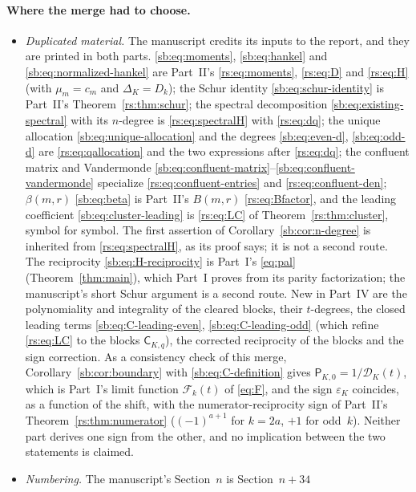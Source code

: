 \documentclass[11pt]{article}
\theoremstyle{definition}
\theoremstyle{remark}
\newcommand{\F}{\mathcal F}
\newcommand{\Den}{\mathcal D}
\newcommand{\Cblock}{\mathsf C}
\newcommand{\Pblock}{\mathsf P}
\newcommand{\epsK}{\varepsilon}
\theoremstyle{definition}
\theoremstyle{plain}
\numberwithin{equation}{section}
\begin{document}
\paragraph{Where the merge had to choose.}
\begin{itemize}
\item \emph{Duplicated material.} The manuscript credits its inputs to
the report, and they are printed in both parts.
\eqref{sb:eq:moments}, \eqref{sb:eq:hankel} and
\eqref{sb:eq:normalized-hankel} are Part~II's \eqref{rs:eq:moments},
\eqref{rs:eq:D} and \eqref{rs:eq:H} (with $\mu_m=c_m$ and $\Delta_K=D_k$);
the Schur identity \eqref{sb:eq:schur-identity} is Part~II's
Theorem~\ref{rs:thm:schur}; the spectral decomposition
\eqref{sb:eq:existing-spectral} with its $n$-degree is
\eqref{rs:eq:spectralH} with \eqref{rs:eq:dq}; the unique allocation
\eqref{sb:eq:unique-allocation} and the degrees \eqref{sb:eq:even-d},
\eqref{sb:eq:odd-d} are \eqref{rs:eq:qallocation} and the two expressions
after \eqref{rs:eq:dq}; the confluent matrix and Vandermonde
\eqref{sb:eq:confluent-matrix}--\eqref{sb:eq:confluent-vandermonde}
specialize \eqref{rs:eq:confluent-entries} and \eqref{rs:eq:confluent-den};
$\beta(m,r)$ \eqref{sb:eq:beta} is Part~II's $B(m,r)$ \eqref{rs:eq:Bfactor},
and the leading coefficient \eqref{sb:eq:cluster-leading} is
\eqref{rs:eq:LC} of Theorem~\ref{rs:thm:cluster}, symbol for symbol. The
first assertion of Corollary~\ref{sb:cor:n-degree} is inherited from
\eqref{rs:eq:spectralH}, as its proof says; it is not a second route. The
reciprocity \eqref{sb:eq:H-reciprocity} is Part~I's \eqref{eq:pal}
(Theorem~\ref{thm:main}), which Part~I proves from its parity
factorization; the manuscript's short Schur argument is a second route.
New in Part~IV are the polynomiality and integrality of the cleared blocks,
their $t$-degrees, the closed leading terms \eqref{sb:eq:C-leading-even},
\eqref{sb:eq:C-leading-odd} (which refine \eqref{rs:eq:LC} to the blocks
$\Cblock_{K,q}$), the corrected reciprocity of the blocks and the sign
correction. As a consistency check of this merge,
Corollary~\ref{sb:cor:boundary} with \eqref{sb:eq:C-definition} gives
$\Pblock_{K,0}=1/\Den_K(t)$, which is
Part~I's limit function $\F_k(t)$ of \eqref{eq:F}, and the sign $\epsK_K$
coincides, as a function of the shift, with the numerator-reciprocity sign
of Part~II's Theorem~\ref{rs:thm:numerator} ($(-1)^{a+1}$ for $k=2a$, $+1$ for
odd~$k$). Neither part derives one sign from the other, and no implication
between the two statements is claimed.
\item \emph{Numbering.} The manuscript's Section~$n$ is Section~$n+34$

\end{itemize}
\end{document}
